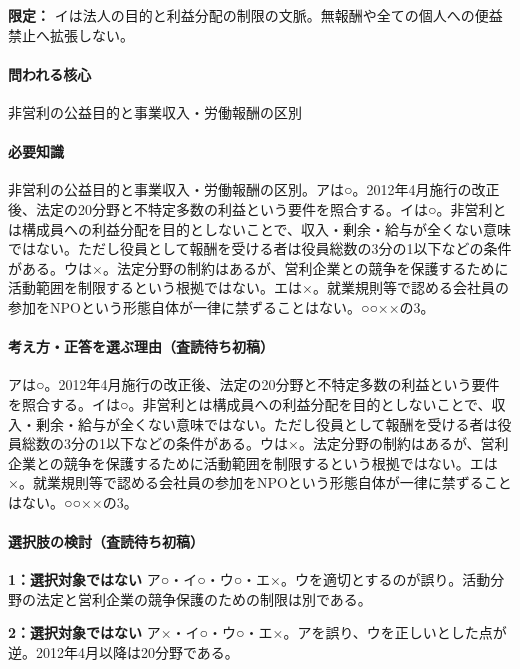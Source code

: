 \noindent\textbf{限定：} イは法人の目的と利益分配の制限の文脈。無報酬や全ての個人への便益禁止へ拡張しない。\par

\paragraph{問われる核心} 非営利の公益目的と事業収入・労働報酬の区別

\paragraph{必要知識} 非営利の公益目的と事業収入・労働報酬の区別。アは○。2012年4月施行の改正後、法定の20分野と不特定多数の利益という要件を照合する。イは○。非営利とは構成員への利益分配を目的としないことで、収入・剰余・給与が全くない意味ではない。ただし役員として報酬を受ける者は役員総数の3分の1以下などの条件がある。ウは×。法定分野の制約はあるが、営利企業との競争を保護するために活動範囲を制限するという根拠ではない。エは×。就業規則等で認める会社員の参加をNPOという形態自体が一律に禁ずることはない。○○××の3。

\paragraph{考え方・正答を選ぶ理由（査読待ち初稿）} アは○。2012年4月施行の改正後、法定の20分野と不特定多数の利益という要件を照合する。イは○。非営利とは構成員への利益分配を目的としないことで、収入・剰余・給与が全くない意味ではない。ただし役員として報酬を受ける者は役員総数の3分の1以下などの条件がある。ウは×。法定分野の制約はあるが、営利企業との競争を保護するために活動範囲を制限するという根拠ではない。エは×。就業規則等で認める会社員の参加をNPOという形態自体が一律に禁ずることはない。○○××の3。

\paragraph{選択肢の検討（査読待ち初稿）}\mbox{}\par

\noindent\textbf{1：選択対象ではない} ア○・イ○・ウ○・エ×。ウを適切とするのが誤り。活動分野の法定と営利企業の競争保護のための制限は別である。\par

\noindent\textbf{2：選択対象ではない} ア×・イ○・ウ○・エ×。アを誤り、ウを正しいとした点が逆。2012年4月以降は20分野である。\par

